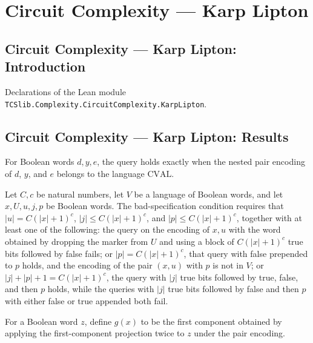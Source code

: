 \section{Circuit Complexity --- Karp Lipton}
\subsection*{Circuit Complexity --- Karp Lipton: Introduction}

Declarations of the Lean module \texttt{TCSlib.Complexity.CircuitComplexity.KarpLipton}.

\subsection*{Circuit Complexity --- Karp Lipton: Results}

\begin{definition}
\label{Complexity.KarpLipton.Query}
\leanok
{}
For Boolean words $d,y,e$, the query holds exactly when the nested pair encoding of $d$,
$y$, and $e$ belongs to the language $\mathrm{CVAL}$.
\end{definition}

\begin{definition}
\label{Complexity.KarpLipton.BadSpec}
\leanok
{}
Let $C,c$ be natural numbers, let $V$ be a language of Boolean words, and let
$x,U,u,j,p$ be Boolean words. The bad-specification condition requires that
$|u|=C(|x|+1)^c$, $|j|\le C(|x|+1)^c$, and $|p|\le C(|x|+1)^c$, together with at least
one of the following: the query on the encoding of $x,u$ with the word obtained by
dropping the marker from $U$ and using a block of $C(|x|+1)^c$ true bits followed by
false fails; or $|p|=C(|x|+1)^c$, that query with false prepended to $p$ holds, and the
encoding of the pair $(x,u)$ with $p$ is not in $V$; or $|j|+|p|+1=C(|x|+1)^c$, the
query with $|j|$ true bits followed by true, false, and then $p$ holds, while the
queries with $|j|$ true bits followed by false and then $p$ with either false or true
appended both fail.
\end{definition}

\begin{definition}
\label{Complexity.KarpLipton.gx}
\leanok
{}
For a Boolean word $z$, define $g(x)$ to be the first component obtained by applying the
first-component projection twice to $z$ under the pair encoding.
\end{definition}

